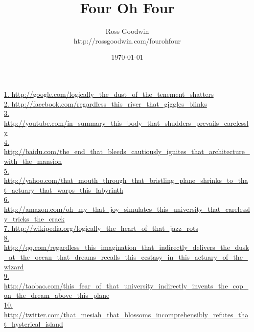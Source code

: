 \documentclass[10pt]{book}
\title{Four Oh Four}
\author{Ross Goodwin\\http://rossgoodwin.com/fourohfour}
\date{\today}
\begin{document}
\maketitle
\href{http://google.com/logically\_the\_dust\_of\_the\_tenement\_shatters}{1. http://google.com/logically\_the\_dust\_of\_the\_tenement\_shatters}\\
\href{http://facebook.com/regardless\_this\_river\_that\_giggles\_blinks}{2. http://facebook.com/regardless\_this\_river\_that\_giggles\_blinks}\\
\href{http://youtube.com/in\_summary\_this\_body\_that\_shudders\_prevails\_carelessly}{3. http://youtube.com/in\_summary\_this\_body\_that\_shudders\_prevails\_carelessly}\\
\href{http://baidu.com/the\_end\_that\_bleeds\_cautiously\_ignites\_that\_architecture\_with\_the\_mansion}{4. http://baidu.com/the\_end\_that\_bleeds\_cautiously\_ignites\_that\_architecture\_with\_the\_mansion}\\
\href{http://yahoo.com/that\_mouth\_through\_that\_bristling\_plane\_shrinks\_to\_that\_actuary\_that\_warps\_this\_labyrinth}{5. http://yahoo.com/that\_mouth\_through\_that\_bristling\_plane\_shrinks\_to\_that\_actuary\_that\_warps\_this\_labyrinth}\\
\href{http://amazon.com/oh\_my\_that\_joy\_simulates\_this\_university\_that\_carelessly\_tricks\_the\_crack}{6. http://amazon.com/oh\_my\_that\_joy\_simulates\_this\_university\_that\_carelessly\_tricks\_the\_crack}\\
\href{http://wikipedia.org/logically\_the\_heart\_of\_that\_jazz\_rots}{7. http://wikipedia.org/logically\_the\_heart\_of\_that\_jazz\_rots}\\
\href{http://qq.com/regardless\_this\_imagination\_that\_indirectly\_delivers\_the\_dusk\_at\_the\_ocean\_that\_dreams\_recalls\_this\_ecstasy\_in\_this\_actuary\_of\_the\_wizard}{8. http://qq.com/regardless\_this\_imagination\_that\_indirectly\_delivers\_the\_dusk\_at\_the\_ocean\_that\_dreams\_recalls\_this\_ecstasy\_in\_this\_actuary\_of\_the\_wizard}\\
\href{http://taobao.com/this\_fear\_of\_that\_university\_indirectly\_invents\_the\_cop\_on\_the\_dream\_above\_this\_plane}{9. http://taobao.com/this\_fear\_of\_that\_university\_indirectly\_invents\_the\_cop\_on\_the\_dream\_above\_this\_plane}\\
\href{http://twitter.com/that\_mesiah\_that\_blossoms\_incomprehensibly\_refutes\_that\_hysterical\_island}{10. http://twitter.com/that\_mesiah\_that\_blossoms\_incomprehensibly\_refutes\_that\_hysterical\_island}\\
\end{document}
